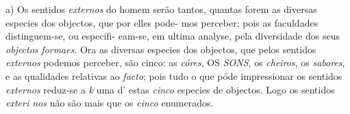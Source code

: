 
 

a) Os sentidos \emph{externos} do homem serão tantos, quantas forem as diversas especies dos objectos, que por elles pode- \textbar{} mos perceber; pois as faculdades distinguem-se, ou especifi- \textbar{} eam-se, em ultima analyse, pela diversidade dos seus \emph{objectos} \textbar{} \emph{formaes}. Ora as diversas especies dos objectos, que pelos sentidos \emph{externos} podemos perceber, são cinco: as \emph{córes}, OS \emph{SONS}, os \emph{cheiros}, os \emph{sabores}, e as qualidades relativas ao \emph{facto}; pois tudo o que póde impressionar os sentidos \emph{externos} reduz-se a \emph{k} uma d' estas \emph{cinco} especies de objectos. Logo os sentidos \emph{exteri nos} não são mais que os \emph{cinco} enumerados. \textbar{}

